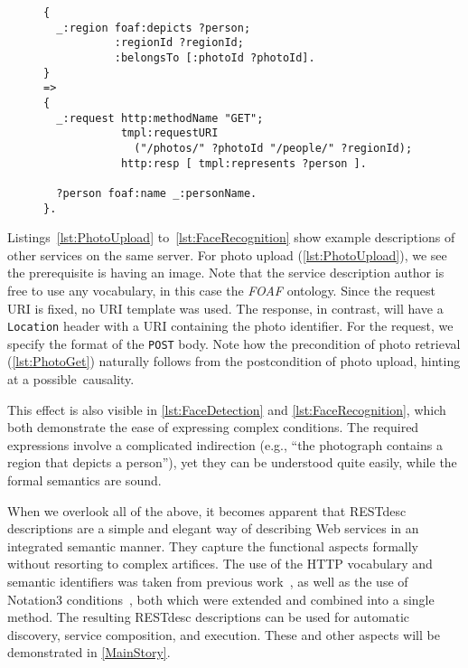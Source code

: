 \documentclass[runningheads,a4paper, twocolumn]{llncs}
\begin{document}
\begin{figure}[float=t!]
\begin{lstlisting}[caption=RESTdesc description of face recognition,
                   label=lst:FaceRecognition, escapechar=§, belowcaptionskip=0em]
{
  _:region foaf:depicts ?person;
           :regionId ?regionId;
           :belongsTo [:photoId ?photoId].
}
=>
{
  _:request http:methodName "GET";
            tmpl:requestURI
              ("/photos/" ?photoId "/people/" ?regionId);
            http:resp [ tmpl:represents ?person ].
  
  ?person foaf:name _:personName.
}.
\end{lstlisting}
\vspace{-2em}
\end{figure}

Listings~\ref{lst:PhotoUpload} to~\ref{lst:FaceRecognition} show example descriptions of other services on the same server. For photo upload (\autoref{lst:PhotoUpload}), we see the prerequisite is having an image. Note that the service description author is free to use any vocabulary, in this case the \emph{FOAF} ontology. Since the request URI is fixed, no URI template was used. The response, in contrast, will have a \Verb!Location! header with a URI containing the photo identifier. For the request, we specify the format of the \Verb!POST! body. Note how the precondition of photo retrieval (\autoref{lst:PhotoGet}) naturally follows from the postcondition of photo upload, hinting at a possible~causality.

This effect is also visible in \autoref{lst:FaceDetection} and \autoref{lst:FaceRecognition}, which both demonstrate the ease of expressing complex conditions. The required expressions involve a complicated indirection (e.g., ``the photograph contains a region that depicts a person''), yet they can be understood quite easily, while the formal semantics are sound.

When we overlook all of the above, it becomes apparent that RESTdesc descriptions are a simple and elegant way of describing Web services in an integrated semantic manner. They capture the functional aspects formally without resorting to complex artifices. The use of the HTTP vocabulary and semantic identifiers was taken from previous work~\cite{Steiner:2011p5006}, as well as the use of \mbox{Notation3} conditions~\cite{Verborgh:2010p2746}, both which were extended and combined into a single method. The resulting \mbox{RESTdesc} descriptions can be used for automatic discovery, service composition, and execution. These and other aspects will be demonstrated in \autoref{MainStory}.
\end{document}

